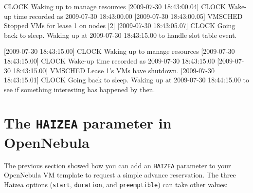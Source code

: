 \begin{wideshellverbatim}
[2009-07-30 18:43:00.04] CLOCK   Waking up to manage resources
[2009-07-30 18:43:00.04] CLOCK   Wake-up time recorded as 2009-07-30 18:43:00.00
[2009-07-30 18:43:00.05] VMSCHED Stopped VMs for lease 1 on nodes [2]
[2009-07-30 18:43:05.07] CLOCK   Going back to sleep. 
                                 Waking up at 2009-07-30 18:43:15.00 
                                 to handle slot table event.

[2009-07-30 18:43:15.00] CLOCK   Waking up to manage resources
[2009-07-30 18:43:15.00] CLOCK   Wake-up time recorded as 2009-07-30 18:43:15.00
[2009-07-30 18:43:15.00] VMSCHED Lease 1's VMs have shutdown.
[2009-07-30 18:43:15.01] CLOCK   Going back to sleep. 
                                 Waking up at 2009-07-30 18:44:15.00 
                                 to see if something interesting has happened by then.
\end{wideshellverbatim}

\section{The \texttt{HAIZEA} parameter in OpenNebula}

The previous section showed how you can add an \texttt{HAIZEA} parameter to your OpenNebula VM template to request a simple advance reservation. The three Haizea options (\texttt{start}, \texttt{duration}, and \texttt{preemptible}) can take other values:

